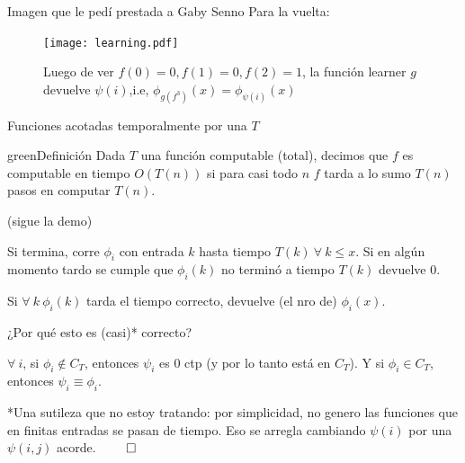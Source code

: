 \documentclass[10pt]{beamer}
\begin{document}
\begin{frame}{Imagen que le pedí prestada a Gaby Senno}
Para la vuelta:

	\begin{figure}[H]
\centering
\texttt{[image: learning.pdf]}
\caption {Luego de ver $f(0)=0, f(1)=0,f(2)=1$, la función learner $g$ devuelve $\psi(i)$,i.e, $\phi_{g(f^3)}(x) = \phi_{\psi(i)}(x)$ \label{figLearn}}
\end{figure}

\end{frame}


\begin{frame}{Funciones acotadas temporalmente por una $T$}
\begin{mybox}{green}{Definición}
Dada $T$ una función computable (total), decimos que $f$ es computable en tiempo $O(T(n))$ si para casi todo $n$ $f$ tarda a lo sumo $T(n)$ pasos en computar $T(n)$.
\end{mybox}

	
	
\end{frame}

\begin{frame}{(sigue la demo)}

Si termina, corre $\phi_i$ con entrada $k$ hasta tiempo $T(k)\ \forall\ k \leq x$. Si en algún momento tardo se cumple que $\phi_i(k)$ no terminó a tiempo $T(k)$ devuelve $0$.
	
	Si $\forall\ k\ \phi_i(k)$ tarda el tiempo correcto, devuelve  (el nro de) $\phi_i(x)$.

¿Por qué esto es (casi)* correcto?
	
$\forall\ i$, si $\phi_i \not \in C_T$, entonces $\psi_i$ es 0 ctp (y por lo tanto está en $C_T$). Y si $\phi_i \in C_T$, entonces $\psi_i \equiv \phi_i$.

*Una sutileza que no estoy tratando: por simplicidad, no genero las funciones que en finitas entradas se pasan de tiempo. Eso se arregla cambiando $\psi(i)$ por una $\psi(i,j)$ acorde. $\qed$


\end{frame}
\end{document}
